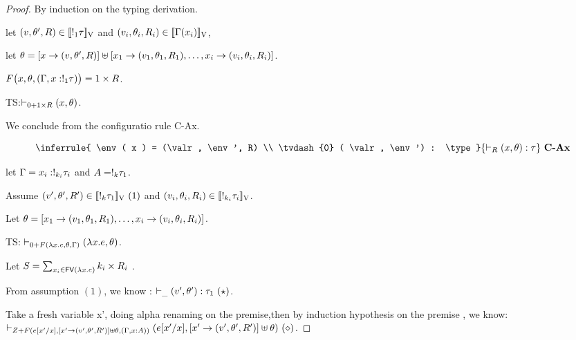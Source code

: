 \begin{proof}
  By induction on the typing derivation.\\


  let $(v, \theta', R) \in [\![ !_{1} \tau ]\!]_{\text{V}}$ and $(v_i,
  \theta_i, R_i) \in [\![ \Gamma(x_i) ]\!]_{\text{V}}$,
 

  let $\theta =  [x \to (v, \theta', R)] \uplus [ x_1 \to (v_1,
  \theta_1, R_1), \ldots,   x_i \to (v_i,
  \theta_i, R_i)]   $.

  $F\big(x,\theta, (\Gamma, x: !_{1} \tau) \big) = 1 \times R $.

  TS:$\vdash_{0 +1 \times R} ( x,   \theta  ) $.

   
  
  We conclude from the configuratio rule C-Ax.
  
  \[ \inferrule{
     \env ( x ) = (\valr, \env', R)
      \\
      \tvdash{0} ( \valr, \env') : \type
    }{
     \tvdash{R}   ( x, \env):  \type
    }~\textbf{C-Ax}
  \]


  let $\Gamma = x_i : !_{k_i} \tau_i$ and  $A = !_{k} \tau_1$.

  Assume $(v', \theta', R') \in [\![  !_{k} \tau_1 ]\!]_{\text{V}}~(1)$ and $ (v_i, \theta_i, R_i) \in [\![ !_{k_i} \tau_i  ]\!]_{\text{V}} $.

Let  $ \theta =  [x_1 \to (v_1, \theta_1, R_1), \ldots,   x_i \to (v_i, \theta_i, R_i)]  $.
  
  TS: $ \vdash_{0 + F(\lambda x. e, \theta, \Gamma)  }   (\lambda
  x.e,  \theta) $.
  

  Let $S = \sum_{x_i \in \mathsf{FV} (\lambda x. e) } k_i \times R_i    $ .

  From assumption $(1)$, we know :  $\vdash_{\_} ( v', \theta') : \tau_1~(\star)$.

  Take a fresh variable x', doing alpha renaming on the premise,then
  by induction hypothesis on the premise , we know: $\vdash_{ Z+
 F(e[x'/x], [x' \to (v', \theta', R')] \uplus \theta,  (\Gamma,x:
 A) )  }   ( e[x'/x],  [x' \to (v', \theta', R')] \uplus \theta
) ~(\diamond) $.


\end{proof}
